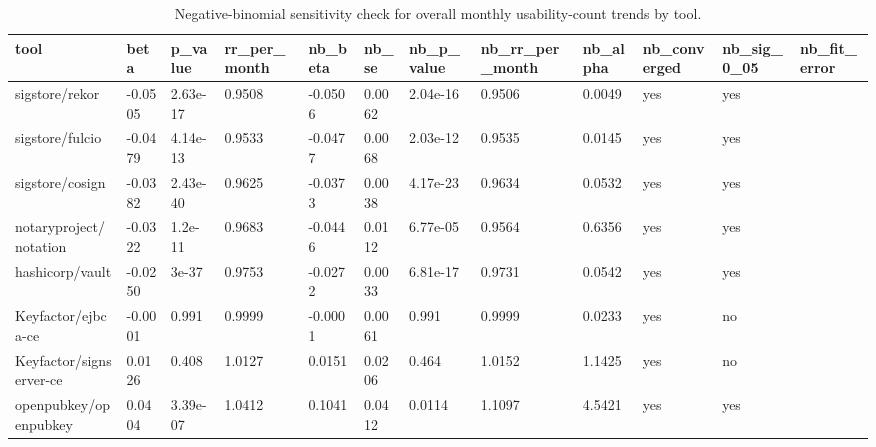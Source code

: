 \begin{table}[t]
\centering
\caption{Negative-binomial sensitivity check for overall monthly usability-count trends by tool.}
\label{tab:nb-sensitivity-overall-by-tool}
\scriptsize
\begin{tabular}{llllllllllll}
\hline
tool & beta & p\_value & rr\_per\_month & nb\_beta & nb\_se & nb\_p\_value & nb\_rr\_per\_month & nb\_alpha & nb\_converged & nb\_sig\_0\_05 & nb\_fit\_error \\
\hline
sigstore/rekor & -0.0505 & 2.63e-17 & 0.9508 & -0.0506 & 0.0062 & 2.04e-16 & 0.9506 & 0.0049 & yes & yes &  \\
sigstore/fulcio & -0.0479 & 4.14e-13 & 0.9533 & -0.0477 & 0.0068 & 2.03e-12 & 0.9535 & 0.0145 & yes & yes &  \\
sigstore/cosign & -0.0382 & 2.43e-40 & 0.9625 & -0.0373 & 0.0038 & 4.17e-23 & 0.9634 & 0.0532 & yes & yes &  \\
notaryproject/notation & -0.0322 & 1.2e-11 & 0.9683 & -0.0446 & 0.0112 & 6.77e-05 & 0.9564 & 0.6356 & yes & yes &  \\
hashicorp/vault & -0.0250 & 3e-37 & 0.9753 & -0.0272 & 0.0033 & 6.81e-17 & 0.9731 & 0.0542 & yes & yes &  \\
Keyfactor/ejbca-ce & -0.0001 & 0.991 & 0.9999 & -0.0001 & 0.0061 & 0.991 & 0.9999 & 0.0233 & yes & no &  \\
Keyfactor/signserver-ce & 0.0126 & 0.408 & 1.0127 & 0.0151 & 0.0206 & 0.464 & 1.0152 & 1.1425 & yes & no &  \\
openpubkey/openpubkey & 0.0404 & 3.39e-07 & 1.0412 & 0.1041 & 0.0412 & 0.0114 & 1.1097 & 4.5421 & yes & yes &  \\
\hline
\end{tabular}
\end{table}
